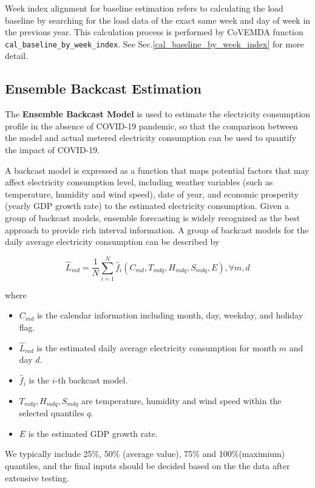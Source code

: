 \documentclass[10pt]{article}
\newcommand{\covemda}{CoVEMDA}
\numberwithin{equation}{section}
\numberwithin{table}{section}
\numberwithin{figure}{section}
\begin{document}
Week index alignment for baseline estimation refers to calculating the load baseline by searching for the load data of the exact same week and day of week in the previous year. This calculation process is performed by \covemda{} function \verb!cal_baseline_by_week_index!. See Sec.\ref{cal_baseline_by_week_index} for more detail.



\subsection{Ensemble Backcast Estimation}
The \textbf{Ensemble Backcast Model} is used to estimate the electricity consumption profile in the absence of COVID-19 pandemic, so that the comparison between the model and actual metered electricity consumption can be used to quantify the impact of COVID-19.

A backcast model is expressed as a function that maps potential factors that may affect electricity consumption level, including weather variables (such as temperature, humidity and wind speed), date of year, and economic prosperity (yearly GDP growth rate) to the estimated electricity consumption. Given a group of backcast models, ensemble forecasting is widely recognized as the best approach to provide rich interval information. A group of backcast models for the daily average electricity consumption can be described by

\begin{equation*}
  \hat L_{md}=\frac{1}{N}\sum\limits_{i=1}^N \hat f_i(C_{md}, T_{mdq}, H_{mdq}, S_{mdq}, E),\forall m,d
\end{equation*}

where 
\begin{itemize}
  \item $C_{md}$ is the calendar information including month, day, weekday, and holiday flag.
  \item $\hat L_{md}$ is the estimated daily average electricity consumption for month $m$ and day $d$.
  \item $\hat f_i$ is the $i$-th backcast model.
  \item $T_{mdq},H_{mdq},S_{mdq}$ are temperature, humidity and wind speed within the selected quantiles $q$.
  \item $E$ is the estimated GDP growth rate.
\end{itemize}
We typically include 25\%, 50\% (average value), 75\% and 100\%(maximium) quantiles, and the final inputs should be decided based on the the data after extensive testing.
\end{document}
